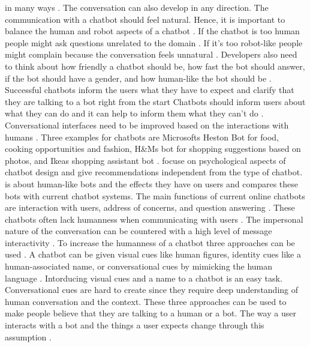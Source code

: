 in many ways \cite{brandtzaeg2018chatbots}.
The conversation can also develop in any direction.
The communication with a chatbot should feel natural.
Hence, it is important to balance the human and robot aspects of a chatbot \cite{brandtzaeg2018chatbots}.
If the chatbot is too human people might ask questions unrelated to the domain \cite{brandtzaeg2018chatbots}.
If it's too robot-like people might complain because the conversation feels unnatural \cite{brandtzaeg2018chatbots}.
Developers also need to think about how friendly a chatbot should be, how fast the bot should answer, if the bot should
have a gender, and how human-like the bot should be \cite{brandtzaeg2018chatbots}.
Successful chatbots inform the users what they have to expect and clarify that they are talking to a bot 
right from the start \cite{brandtzaeg2018chatbots}
Chatbots should inform users about what they can do and it can help to inform them what 
they can't do \cite{brandtzaeg2018chatbots}.
Conversational interfaces need to be improved based on the interactions with humans \cite{brandtzaeg2018chatbots}.
Three examples for chatbots are Microsofts Heston Bot for food, cooking opportunities and fashion, H\&Ms bot for shopping 
suggestions based on photos, and Ikeas shopping assistant bot \cite{brandtzaeg2018chatbots}.
\citet{brandtzaeg2018chatbots} focuse on psychological aspects of chatbot design and give recommendations
independent from the type of chatbot.
\citet{GO2019304} is about human-like bots and the 
effects they have on users and compares these bots with current chatbot systems.
The main functions of current online chatbots are interaction with users, address of concerns, and question answering \cite{GO2019304}.
These chatbots often lack humanness when communicating with users \cite{GO2019304}.
The impersonal nature of the conversation can be countered with a high level of message interactivity \cite{GO2019304}.
To increase the humanness of a chatbot three approaches can be used \cite{GO2019304}.
A chatbot can be given visual cues like human figures, identity cues like a human-associated name, or 
conversational cues by mimicking the human language \cite{GO2019304}.
Intorducing visual cues and a name to a chatbot is an easy task.
Conversational cues are hard to create since they require deep
understanding of human conversation and the context.
These three approaches can be used to make people believe that they are talking to a human or a bot.
The way a user interacts with a bot and the things a user expects change through this assumption \cite{sundar2016theoretical, GO2019304}.
